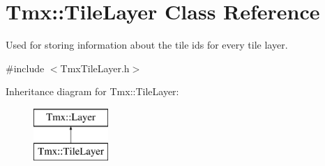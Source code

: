 \hypertarget{classTmx_1_1TileLayer}{\section{Tmx\-:\-:Tile\-Layer Class Reference}
\label{classTmx_1_1TileLayer}
}


Used for storing information about the tile ids for every tile layer.  




{\ttfamily \#include $<$Tmx\-Tile\-Layer.\-h$>$}

Inheritance diagram for Tmx\-:\-:Tile\-Layer\-:\begin{figure}[H]
\begin{center}
\leavevmode
\includegraphics[height=2.000000cm]{classTmx_1_1TileLayer}
\end{center}
\end{figure}
